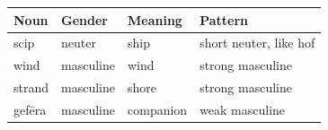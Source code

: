 \par\begingroup
\fontsize{10.5}{13.2}\selectfont
\setlength{\LTleft}{0pt}\setlength{\LTright}{\fill}
\noindent
\begin{tabular}{@{}>{\raggedright\arraybackslash}p{25.77mm}>{\raggedright\arraybackslash}p{25.77mm}>{\raggedright\arraybackslash}p{25.77mm}>{\raggedright\arraybackslash}p{38.26mm}@{}}
\toprule
\textbf{Noun} & \textbf{Gender} & \textbf{Meaning} & \textbf{Pattern} \\
\midrule
scip & neuter & ship & short neuter, like hof \\
wind & masculine & wind & strong masculine \\
strand & masculine & shore & strong masculine \\
gefēra & masculine & companion & weak masculine \\
\bottomrule
\end{tabular}
\par\endgroup

